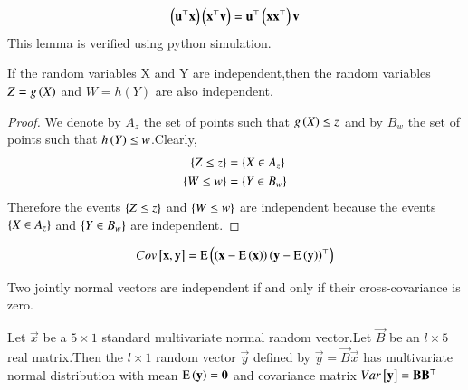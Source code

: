 \begin{lemma}
\label{gauss/3/l2.1}
\begin{align}
   \left(\mathbf{u}^{\top}\mathbf{x}\right)\left(\mathbf{x}^{\top}\mathbf{v}\right)=\mathbf{u}^{\top}\left(\mathbf{x}\mathbf{x}^{\top}\right)\mathbf{v}
\end{align}
This lemma is verified using python simulation.
\end{lemma}
\begin{theorem}
\label{gauss/3/shit}
If the random variables X and Y are independent,then the random variables $Z=g\left(X\right)$ and $W=h(Y)$ are also independent.
\end{theorem}
\begin{proof}
We denote by $A_z$ the set of points such that $g\left(X\right)\leq \textit{z}$ and by  $B_w$ the set of points such that $h\left(Y\right)\leq \textit{w}$.Clearly,
\begin{align}
    \left\{Z\leq \textit{z}\right\}&=\left\{X\in A_z\right\}\\
    \left\{W\leq \textit{w}\right\}&=\left\{Y\in B_w\right\}
\end{align}
Therefore the events $\left\{Z\leq \textit{z}\right\}$ and $\left\{W\leq \textit{w}\right\}$ are independent because the events $\left\{X\in A_z\right\}$ and $\left\{Y\in B_w\right\}$ are independent.
\end{proof}
\begin{definition}
\begin{align}
    Cov{}\left[\mathbf{x},\mathbf{y}\right]=\text{E}\left( \left(\mathbf{x}-\text{E}\left( \mathbf{x} \right)\right)\left(\mathbf{y}-\text{E}\left( \mathbf{y} \right)\right)^{\top} \right)
\end{align}
\end{definition}
\begin{lemma}
Two jointly normal vectors are independent if and only if their cross-covariance is zero.
\end{lemma}
\begin{theorem}
\label{gauss/3/t2.2}
Let $\vec{x}$ be a $5\times 1$ standard multivariate normal random vector.Let $\vec{B}$ be an $l\times 5$ real matrix.Then the $l\times 1$ random vector $\vec{y}$ defined by $\vec{y}=\vec{B}\vec{x}$ has multivariate normal distribution with mean $\text{E}\left( \mathbf{y} \right)=\mathbf{0}$ and covariance matrix $Var{}\left[\mathbf{y}\right]=\mathbf{B}\mathbf{B}^{\top}$ 
\end{theorem}
